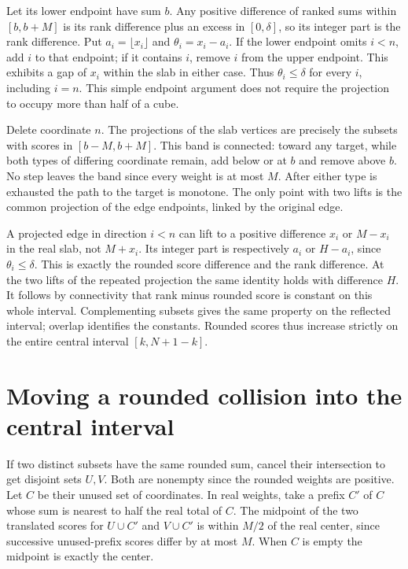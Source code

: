 \documentclass[11pt,letterpaper]{article}
\begin{document}
Let its lower endpoint have sum \(b\). Any positive difference
of ranked sums within \([b,b+M]\) is its rank difference plus
an excess in \([0,\delta]\), so its integer part is the rank
difference. Put \(a_i=\lfloor x_i\rfloor\) and
\(\theta_i=x_i-a_i\). If the lower endpoint omits \(i<n\), add
\(i\) to that endpoint; if it contains \(i\), remove \(i\) from
the upper endpoint. This exhibits a gap of \(x_i\) within the
slab in either case. Thus \(\theta_i\le\delta\) for every \(i\),
including \(i=n\). This simple endpoint argument does not require
the projection to occupy more than half of a cube.

Delete coordinate \(n\). The projections of the slab vertices
are precisely the subsets with scores in \([b-M,b+M]\).
This band is connected: toward any target, while both types of
differing coordinate remain, add below or at \(b\) and remove
above \(b\). No step leaves the band since every weight is at
most \(M\). After either type is exhausted the path to the
target is monotone. The only point with two lifts is the common
projection of the edge endpoints, linked by the original edge.

A projected edge in direction \(i<n\) can lift to a positive
difference \(x_i\) or \(M-x_i\) in the real slab, not
\(M+x_i\). Its integer part is respectively \(a_i\) or
\(H-a_i\), since \(\theta_i\le\delta\). This is exactly the
rounded score difference and the rank difference. At the two
lifts of the repeated projection the same identity holds with
difference \(H\). It follows by connectivity that rank minus
rounded score is constant on this whole interval. Complementing
subsets gives the same property on the reflected interval;
overlap identifies the constants. Rounded scores thus increase
strictly on the entire central interval \([k,N+1-k]\).

\section{Moving a rounded collision into the central interval}
If two distinct subsets have the same rounded sum, cancel their
intersection to get disjoint sets \(U,V\). Both are nonempty since
the rounded weights are positive. Let \(C\) be their unused set
of coordinates. In real weights, take a prefix \(C'\) of \(C\)
whose sum is nearest to half the real total of \(C\).
The midpoint of the two translated scores for \(U\cup C'\) and
\(V\cup C'\) is within \(M/2\) of the real center, since
successive unused-prefix scores differ by at most \(M\).
When \(C\) is empty the midpoint is exactly the center.
\end{document}
